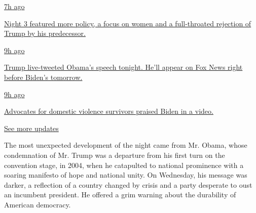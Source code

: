 \href{https://www.nytimes3xbfgragh.onion/live/2020/08/19/us/dnc-convention-election?action=click\&pgtype=Article\&state=default\&region=MAIN_CONTENT_1\&context=storylines_live_updates\#night-3-featured-more-policy-a-focus-on-women-and-a-full-throated-rejection-of-trump-by-his-predecessor}{7h
ago}

\href{https://www.nytimes3xbfgragh.onion/live/2020/08/19/us/dnc-convention-election?action=click\&pgtype=Article\&state=default\&region=MAIN_CONTENT_1\&context=storylines_live_updates\#night-3-featured-more-policy-a-focus-on-women-and-a-full-throated-rejection-of-trump-by-his-predecessor}{Night
3 featured more policy, a focus on women and a full-throated rejection
of Trump by his predecessor.}

\href{https://www.nytimes3xbfgragh.onion/live/2020/08/19/us/dnc-convention-election?action=click\&pgtype=Article\&state=default\&region=MAIN_CONTENT_1\&context=storylines_live_updates\#trump-live-tweeted-obamas-speech-tonight-hell-appear-on-fox-news-right-before-bidens-tomorrow}{9h
ago}

\href{https://www.nytimes3xbfgragh.onion/live/2020/08/19/us/dnc-convention-election?action=click\&pgtype=Article\&state=default\&region=MAIN_CONTENT_1\&context=storylines_live_updates\#trump-live-tweeted-obamas-speech-tonight-hell-appear-on-fox-news-right-before-bidens-tomorrow}{Trump
live-tweeted Obama's speech tonight. He'll appear on Fox News right
before Biden's tomorrow.}

\href{https://www.nytimes3xbfgragh.onion/live/2020/08/19/us/dnc-convention-election?action=click\&pgtype=Article\&state=default\&region=MAIN_CONTENT_1\&context=storylines_live_updates\#advocates-for-domestic-violence-survivors-praised-biden-in-a-video}{9h
ago}

\href{https://www.nytimes3xbfgragh.onion/live/2020/08/19/us/dnc-convention-election?action=click\&pgtype=Article\&state=default\&region=MAIN_CONTENT_1\&context=storylines_live_updates\#advocates-for-domestic-violence-survivors-praised-biden-in-a-video}{Advocates
for domestic violence survivors praised Biden in a video.}

\href{https://www.nytimes3xbfgragh.onion/live/2020/08/19/us/dnc-convention-election?action=click\&pgtype=Article\&state=default\&region=MAIN_CONTENT_1\&context=storylines_live_updates}{See
more updates}

The most unexpected development of the night came from Mr. Obama, whose
condemnation of Mr. Trump was a departure from his first turn on the
convention stage, in 2004, when he catapulted to national prominence
with a soaring manifesto of hope and national unity. On Wednesday, his
message was darker, a reflection of a country changed by crisis and a
party desperate to oust an incumbent president. He offered a grim
warning about the durability of American democracy.

